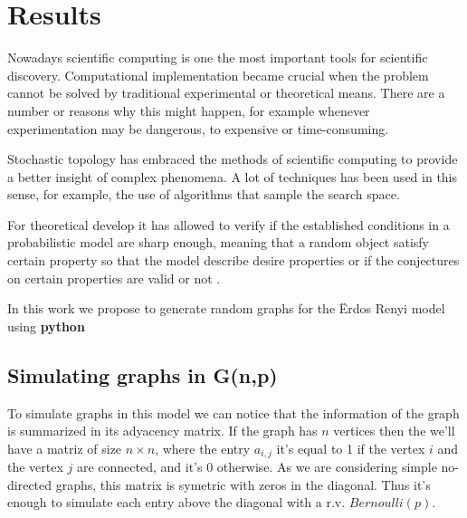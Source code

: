 
\chapter{Results} %

\label{Chapter3} %



Nowadays scientific computing is one the most important tools for scientific discovery. Computational implementation became crucial when the problem cannot be solved by traditional experimental or theoretical means. There are a number or reasons why this might happen, for example whenever experimentation may be dangerous, to expensive or time-consuming.

Stochastic topology has embraced the methods of scientific computing to provide a better insight of complex phenomena. A lot of techniques has been used in this sense, for example, the use of algorithms that sample the search space.

For theoretical develop it has allowed to verify if the established conditions in a probabilistic model are sharp enough, meaning that a random object satisfy certain property  so that the model describe desire properties or if the conjectures on certain properties are valid or not \cite{Meshulam13}.

In this work we propose to generate random graphs for the Ërdos Renyi model using \textbf{python}

\section{Simulating graphs in G(n,p)}
 To simulate graphs in this model we can notice that the information of the graph is summarized in its adyacency matrix. If the graph has $n$ vertices then the we'll have a matriz of size $n \times n$, where the entry $a_{i,j}$ it's equal to 1 if the vertex $i$ and the vertex $j$ are connected, and it's $0$ otherwise. As we are considering simple no-directed graphs, this matrix is symetric with zeros in the diagonal. Thus it's enough to simulate each entry above the diagonal with a r.v. $Bernoulli(p)$.

